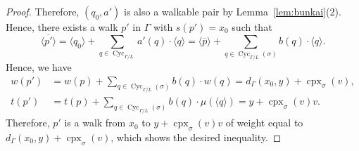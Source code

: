 \documentclass[11pt]{article}
\theoremstyle{definition}
\numberwithin{equation}{section}
\begin{document}
\begin{proof}
Therefore, $(q_0, a')$ is also a walkable pair by Lemma~\ref{lem:bunkai}(2). 
Hence, there exists a walk $p'$ in $\Gamma$ with $s(p') = x_0$ such that 
\[
\langle \overline{p'} \rangle = \langle q_0 \rangle + \sum _{q \in \operatorname{Cyc}_{\Gamma /L}} a'(q) \cdot \langle q \rangle
= \langle \overline{p} \rangle + \sum _{q \in \operatorname{Cyc}_{\Gamma /L}(\sigma)} b(q) \cdot \langle q \rangle. 
\]
Hence, we have 
\begin{align*}
w(p') 
&= w(p) + \sum _{q \in \operatorname{Cyc}_{\Gamma /L}(\sigma)} b(q) \cdot w(q) 
= d_{\Gamma}( x_0, y) + \operatorname{cpx}_{\sigma}(v), \\
t(p') 
&= t(p) + \sum _{q \in \operatorname{Cyc}_{\Gamma /L}(\sigma)} b(q) \cdot \mu(\langle q \rangle) 
= y + \operatorname{cpx}_{\sigma}(v)v. 
\end{align*}
Therefore, $p'$ is a walk from $x_0$ to $y + \operatorname{cpx}_{\sigma}(v)v$ of weight 
equal to $d_{\Gamma}( x_0, y) + \operatorname{cpx}_{\sigma}(v)$, which shows the desired inequality. 
\end{proof}
\end{document}
